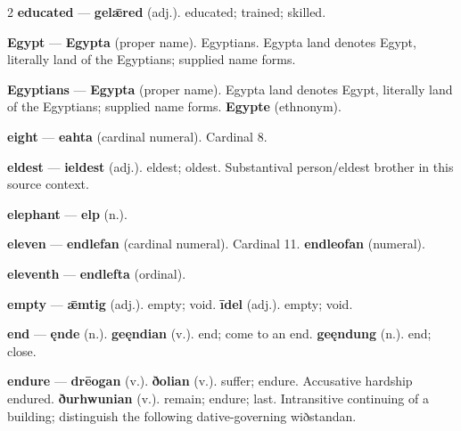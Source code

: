\begin{multicols}{2}
\textbf{educated} — \textbf{gelǣred} (adj.). educated; trained; skilled.\par
\textbf{Egypt} — \textbf{Egypta} (proper name). Egyptians. Egypta land denotes Egypt, literally land of the Egyptians; supplied name forms.\par
\textbf{Egyptians} — \textbf{Egypta} (proper name). Egypta land denotes Egypt, literally land of the Egyptians; supplied name forms. \textbf{Egypte} (ethnonym).\par
\textbf{eight} — \textbf{eahta} (cardinal numeral). Cardinal 8.\par
\textbf{eldest} — \textbf{ieldest} (adj.). eldest; oldest. Substantival person/eldest brother in this source context.\par
\textbf{elephant} — \textbf{elp} (n.).\par
\textbf{eleven} — \textbf{endlefan} (cardinal numeral). Cardinal 11. \textbf{endleofan} (numeral).\par
\textbf{eleventh} — \textbf{endlefta} (ordinal).\par
\textbf{empty} — \textbf{ǣmtig} (adj.). empty; void. \textbf{īdel} (adj.). empty; void.\par
\textbf{end} — \textbf{ęnde} (n.).  \textbf{geęndian} (v.). end; come to an end. \textbf{geęndung} (n.). end; close.\par
\textbf{endure} — \textbf{drēogan} (v.).  \textbf{ðolian} (v.). suffer; endure. Accusative hardship endured. \textbf{ðurhwunian} (v.). remain; endure; last. Intransitive continuing of a building; distinguish the following dative-governing wiðstandan.\par

\end{multicols}
